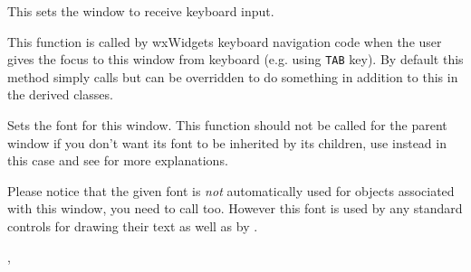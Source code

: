 \label{wxwindowsetfocus}


This sets the window to receive keyboard input.




\label{wxwindowsetfocusfromkbd}


This function is called by wxWidgets keyboard navigation code when the user
gives the focus to this window from keyboard (e.g. using {\tt TAB} key).
By default this method simply calls  but
can be overridden to do something in addition to this in the derived classes.


\label{wxwindowsetfont}


Sets the font for this window. This function should not be called for the
parent window if you don't want its font to be inherited by its children,
use  instead in this case and
see  for more
explanations.

Please notice that the given font is \emph{not} automatically used for 
 objects associated with this window, you need to
call  too. However this font is used by
any standard controls for drawing their text as well as by 
.




,\\


\label{wxwindowsetforegroundcolour}


